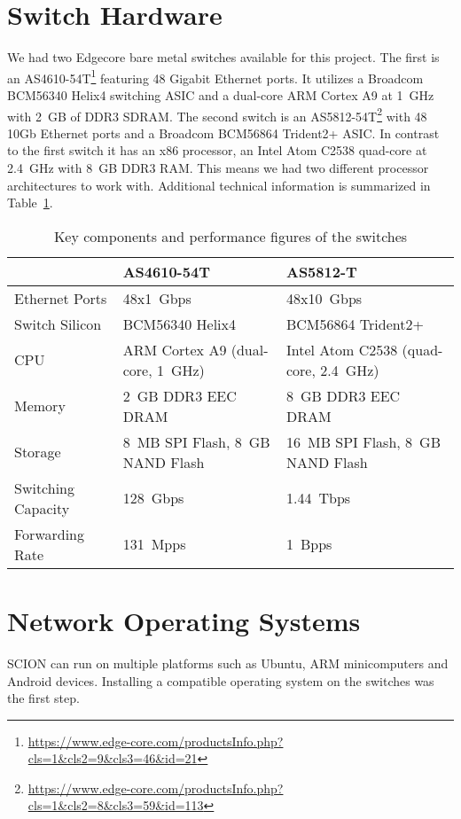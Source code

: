 \documentclass[a4paper]{article}
\begin{document}
\section{Switch Hardware}
We had two Edgecore bare metal switches available for this project. The first is an AS4610-54T\footnote{\url{https://www.edge-core.com/productsInfo.php?cls=1&cls2=9&cls3=46&id=21}} featuring 48 Gigabit Ethernet ports. It utilizes a Broadcom BCM56340 Helix4 switching ASIC and a dual-core ARM Cortex A9 at 1~GHz with 2~GB of DDR3 SDRAM. The second switch is an AS5812-54T\footnote{\url{https://www.edge-core.com/productsInfo.php?cls=1&cls2=8&cls3=59&id=113}} with 48 10Gb Ethernet ports and a Broadcom BCM56864 Trident2+ ASIC. In contrast to the first switch it has an x86 processor, an Intel Atom C2538 quad-core at 2.4~GHz with 8~GB DDR3 RAM. This means we had two different processor architectures to work with. Additional technical information is summarized in Table~\ref{tab:switch_specs}.

\begin{table}[thb]
\begin{tabular}{l|l|l}
& AS4610-54T & AS5812-T \\
\hline
Ethernet Ports & 48x1~Gbps & 48x10~Gbps \\
Switch Silicon & BCM56340 Helix4 & BCM56864 Trident2+ \\
CPU & ARM Cortex A9 (dual-core, 1~GHz) & Intel Atom C2538 (quad-core, 2.4~GHz) \\
Memory & 2~GB DDR3 EEC DRAM & 8~GB DDR3 EEC DRAM \\
Storage & 8~MB SPI Flash, 8~GB NAND Flash & 16~MB SPI Flash, 8~GB NAND Flash \\
Switching Capacity & 128~Gbps & 1.44~Tbps \\
Forwarding Rate & 131~Mpps & 1~Bpps \\
\end{tabular}
\caption{Key components and performance figures of the switches}
\label{tab:switch_specs}
\end{table}


\section{Network Operating Systems}
SCION can run on multiple platforms such as Ubuntu, ARM minicomputers and Android devices. Installing a compatible operating system on the switches was the first step.
\end{document}
